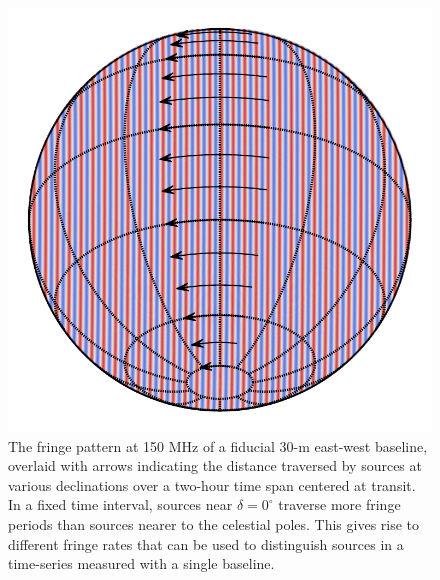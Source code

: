 \documentclass[twocolumn,apj,numberedappendix]{emulateapj}
\begin{document}
\begin{figure}\centering
\includegraphics[width=.9\columnwidth]{plots/ew_fringe}
\caption{
The fringe pattern at 150 MHz of a fiducial 30-m east-west baseline, overlaid with arrows indicating
the distance traversed by sources at various declinations over a two-hour time span centered at transit.
In a fixed time interval, sources near $\delta=0^\circ$ traverse more 
fringe periods than sources nearer to the celestial poles. This gives rise to different
fringe rates that can be used to distinguish sources in a time-series measured with a single baseline.
}\label{fig:ew_fringe}
\end{figure}
\end{document}

